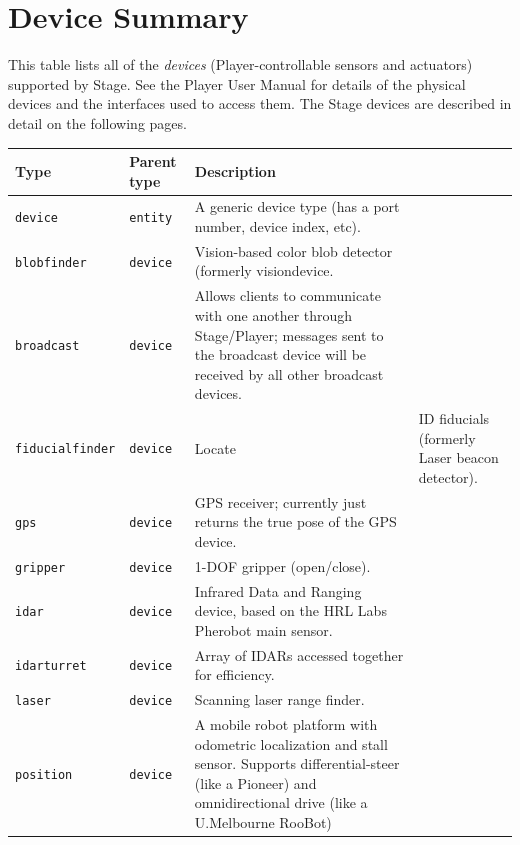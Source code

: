 \documentclass[11pt,twoside]{report}
\begin{document}
\newpage
\section{Device Summary}
\label{sec.ref.devices}

This table lists all of the {\em devices} (Player-controllable sensors
and actuators) supported by Stage.  See the Player User Manual for
details of the physical devices and the interfaces used to access
them. The Stage devices are described in detail on the following
pages.
\vspace{1em}\\\noindent
\begin{tabularx}{\columnwidth}{llX}
\hline 
Type & Parent type & Description \\
\hline

\verb'device' & \verb'entity' & A generic device type (has a port
number, device index, etc). \\

\hline

\verb'blobfinder' & \verb'device' & Vision-based color blob detector
(formerly visiondevice.\\

\verb'broadcast' & \verb'device' & Allows clients to communicate with
one another through Stage/Player; messages sent to the broadcast
device will be received by all other broadcast devices.\\

\verb'fiducialfinder' & \verb'device' & Locate & ID fiducials (formerly Laser
beacon detector).\\

\verb'gps' & \verb'device' & GPS receiver; currently just returns the
true pose of the GPS device.\\

\verb'gripper' & \verb'device' & 1-DOF gripper (open/close).\\

\verb'idar' & \verb'device' & Infrared Data and Ranging device, based
on the HRL Labs Pherobot main sensor.\\

\verb'idarturret' & \verb'device' & Array of IDARs accessed together
for efficiency.\\

\verb'laser' & \verb'device' & Scanning laser range finder.\\

\verb'position' & \verb'device' & A mobile robot platform with
odometric localization and stall sensor. Supports differential-steer
(like a Pioneer) and omnidirectional drive (like a U.Melbourne
RooBot)\\


\end{tabularx}
\end{document}
